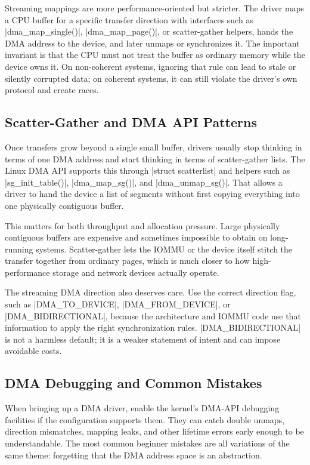 \documentclass[10pt, oneside]{book}
\begin{document}
Streaming mappings are more performance-oriented but stricter.
The driver maps a CPU buffer for a specific transfer direction with interfaces
such as \cpp|dma_map_single()|, \cpp|dma_map_page()|, or scatter-gather helpers,
hands the DMA address to the device, and later unmaps or synchronizes it.
The important invariant is that the CPU must not treat the buffer as ordinary
memory while the device owns it.
On non-coherent systems, ignoring that rule can lead to stale or silently
corrupted data; on coherent systems, it can still violate the driver's own
protocol and create races.

\subsection{Scatter-Gather and DMA API Patterns}
\label{sec:dma_sg}
Once transfers grow beyond a single small buffer, drivers usually stop thinking
in terms of one DMA address and start thinking in terms of scatter-gather
lists.
The Linux DMA API supports this through \cpp|struct scatterlist| and helpers
such as \cpp|sg_init_table()|, \cpp|dma_map_sg()|, and \cpp|dma_unmap_sg()|.
That allows a driver to hand the device a list of segments without first
copying everything into one physically contiguous buffer.

This matters for both throughput and allocation pressure.
Large physically contiguous buffers are expensive and sometimes impossible to
obtain on long-running systems.
Scatter-gather lets the IOMMU or the device itself stitch the transfer together
from ordinary pages, which is much closer to how high-performance storage and
network devices actually operate.

The streaming DMA direction also deserves care.
Use the correct direction flag, such as \cpp|DMA_TO_DEVICE|,
\cpp|DMA_FROM_DEVICE|, or \cpp|DMA_BIDIRECTIONAL|, because the architecture and
IOMMU code use that information to apply the right synchronization rules.
\cpp|DMA_BIDIRECTIONAL| is not a harmless default; it is a weaker statement of
intent and can impose avoidable costs.

\subsection{DMA Debugging and Common Mistakes}
\label{sec:dma_debug}
When bringing up a DMA driver, enable the kernel's DMA-API debugging facilities
if the configuration supports them.
They can catch double unmaps, direction mismatches, mapping leaks, and other
lifetime errors early enough to be understandable.
The most common beginner mistakes are all variations of the same theme:
forgetting that the DMA address space is an abstraction.
\end{document}
